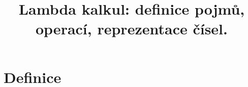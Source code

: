 \documentclass{szzclass}
\title{Lambda kalkul: definice pojmů, operací, reprezentace čísel.}
\begin{document}
\maketitle

\section{Definice}
\end{document}
